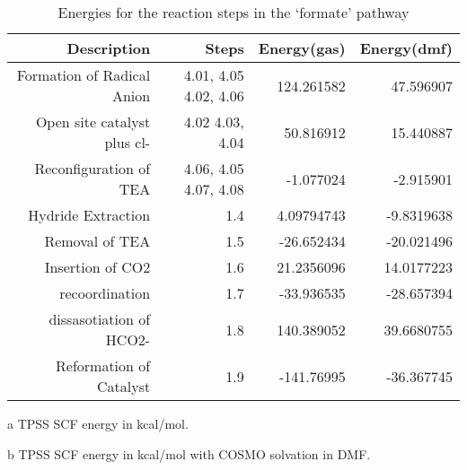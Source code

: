 \begin{table}[!htb]
\centering
 \begin{threeparttable}
  \caption{Energies for the reaction steps in the `formate' pathway}
    \begin{tabular}{rrrr}
    \toprule
    Description & Steps & Energy(gas)\tnote{a} & Energy(dmf)\tnote{b} \\
    \midrule
    Formation of Radical Anion & 4.01, 4.05 \ce{->} 4.02, 4.06   & 124.261582 & 47.596907 \\
    Open site catalyst plus cl- & 4.02 \ce{->} 4.03, 4.04 & 50.816912 & 15.440887 \\
    Reconfiguration of TEA & 4.06, 4.05 \ce{->} 4.07, 4.08 & -1.077024 & -2.915901 \\
    \midrule
    Hydride Extraction & 1.4   & 4.09794743 & -9.8319638 \\
    Removal of TEA & 1.5   & -26.652434 & -20.021496 \\
    Insertion of CO2 & 1.6   & 21.2356096 & 14.0177223 \\
    recoordination & 1.7   & -33.936535 & -28.657394 \\
    dissasotiation of HCO2- & 1.8   & 140.389052 & 39.6680755 \\
    Reformation of Catalyst & 1.9   & -141.76995 & -36.367745 \\
    \bottomrule
    \end{tabular}%
    \begin{tablenotes}
    \item [a] TPSS SCF energy in kcal/mol.
    \item [b] TPSS SCF energy in kcal/mol with COSMO solvation in DMF.
    \end{tablenotes}
  \label{tab.formrxn}%
 \end{threeparttable}
\end{table}%

